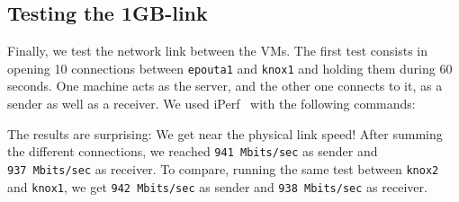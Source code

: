 
\subsection{Testing the 1GB-link}
\label{section:experiments:link}

Finally, we test the network link between the VMs.
%
The first test consists in opening 10 connections between
\texttt{epouta1} and \texttt{knox1} and holding them during 60
seconds.  One machine acts as the server, and the other one connects
to it, as a sender as well as a receiver. We used iPerf~\cite{iperf}
with the following commands:


The results are surprising: We get near the physical link speed! After
summing the different connections, we reached \texttt{941\ Mbits/sec} as
sender and \texttt{937\ Mbits/sec} as receiver. To compare, running the
same test between \texttt{knox2} and \texttt{knox1}, we get
\texttt{942\ Mbits/sec} as sender and \texttt{938\ Mbits/sec} as
receiver.

